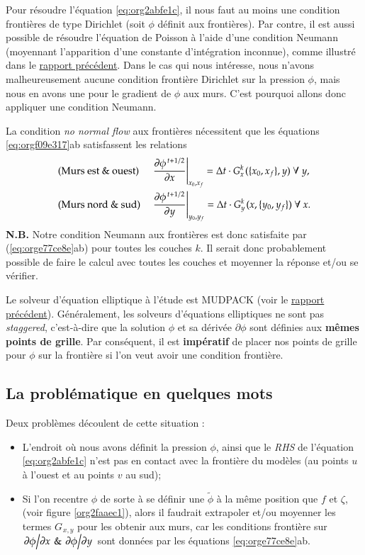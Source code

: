 \documentclass[10pt]{article}
\numberwithin{equation}{section}
\newcommand{\pt}{\hspace{1pt}}
\begin{document}
Pour résoudre l'équation \ref{eq:org2abfe1c}, il nous faut au moins une condition frontières de type Dirichlet (soit \(\phi\) définit aux frontières).
Par contre, il est aussi possible de résoudre l'équation de Poisson à l'aide d'une condition Neumann (moyennant l'apparition d'une constante d'intégration inconnue), comme illustré dans le \href{rapport-2023-04-21.org}{rapport précédent}.
Dans le cas qui nous intéresse, nous n'avons malheureusement aucune condition frontière Dirichlet sur la pression \(\phi\), mais nous en avons une pour le gradient de \(\phi\) aux murs.
C'est pourquoi allons donc appliquer une condition Neumann.\bigskip

La condition \emph{no normal flow} aux frontières nécessitent que les équations \ref{eq:orgf09e317}ab satisfassent les relations
\begin{subequations}
\label{eq:orge77ce8e}
\begin{align}
&& &\text{(Murs est \& ouest)}
&&\eval{\pdv{\phi^{\pt t+1/2}}{x}}_{x_0,x_f} =  \Delta t\cdot G^k_x\pt (\{x_0,x_f\},y)\ \forall\ y,&&\\
&& &\text{(Murs nord \& sud)}
&&\eval{\pdv{\phi^{\pt t+1/2}}{y}}_{y_0,y_f} =  \Delta t\cdot G^k_y\pt (x,\{y_0,y_f\})\ \forall\ x.&&
\end{align}
\end{subequations}
\textbf{N.B.} Notre condition Neumann aux frontières est donc satisfaite par (\ref{eq:orge77ce8e}ab) pour toutes les couches \(k\).
Il serait donc probablement possible de faire le calcul avec toutes les couches et moyenner la réponse et/ou se vérifier.\bigskip

Le solveur d'équation elliptique à l'étude est MUDPACK (voir le \href{rapport-2023-04-21.org}{rapport précédent}).
Généralement, les solveurs d'équations elliptiques ne sont pas \emph{staggered}, c'est-à-dire que la solution \(\phi\) et sa dérivée \(\partial\phi\) sont définies aux \textbf{mêmes points de grille}.
Par conséquent, il est \textbf{impératif} de placer nos points de grille pour \(\phi\) sur la frontière si l'on veut avoir une condition frontière.

\subsection{La problématique en quelques mots}
\label{sec:org148ab41}

Deux problèmes découlent de cette situation :
\begin{itemize}
\item L'endroit où nous avons définit la pression \(\phi\), ainsi que le \emph{RHS} de l'équation \ref{eq:org2abfe1c} n'est pas en contact avec la frontière du modèles (au points \(u\) à l'ouest et au points \(v\) au sud);
\item Si l'on recentre \(\phi\) de sorte à se définir une \(\tilde{\phi}\) à la même position que \(f\) et \(\zeta\), (voir figure \ref{org2faaec1}), alors il faudrait extrapoler et/ou moyenner les termes \(G_{\pt x,y}\) pour les obtenir aux murs, car les conditions frontière sur \(\pdv*{\phi}{x}\pt \& \pt \pdv*{\phi}{y}\) sont données par les équations \ref{eq:orge77ce8e}ab.
\end{itemize}
\end{document}
